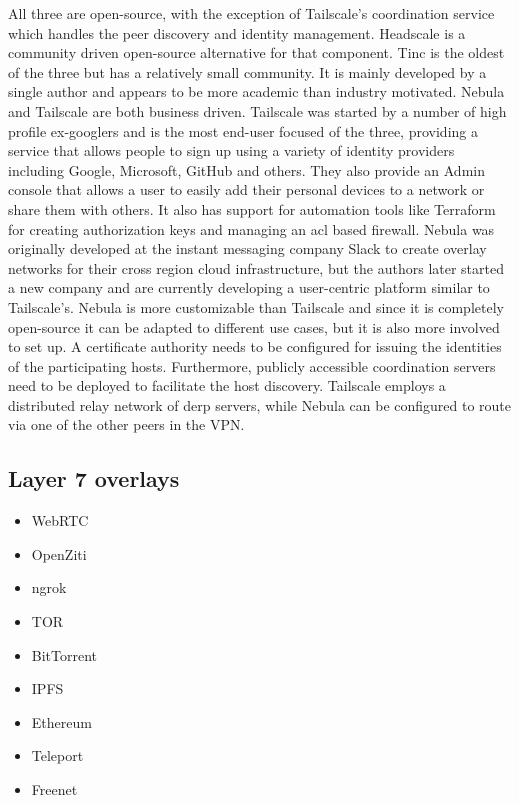 All three are open-source, with the exception of Tailscale's
coordination service which handles the peer discovery and identity
management. Headscale \autocite{fontJuanfontHeadscale2022} is a
community driven open-source alternative for that component. Tinc is the
oldest of the three but has a relatively small community. It is mainly
developed by a single author and appears to be more academic than
industry motivated. Nebula and Tailscale are both business driven.
Tailscale was started by a number of high profile ex-googlers and is the
most end-user focused of the three, providing a service that allows
people to sign up using a variety of identity providers including
Google, Microsoft, GitHub and others. They also provide an Admin console
that allows a user to easily add their personal devices to a network or
share them with others. It also has support for automation tools like
Terraform for creating authorization keys and managing an \gls{acl}
based firewall. Nebula was originally developed at the instant messaging
company Slack to create overlay networks for their cross region cloud
infrastructure, but the authors later started a new company and are
currently developing a user-centric platform similar to Tailscale's.
Nebula is more customizable than Tailscale and since it is completely
open-source it can be adapted to different use cases, but it is also
more involved to set up. A certificate authority needs to be configured
for issuing the identities of the participating hosts. Furthermore,
publicly accessible coordination servers need to be deployed to
facilitate the host discovery. Tailscale employs a distributed relay
network of \gls{derp} servers, while Nebula can be configured to route
via one of the other peers in the VPN.

\hypertarget{layer-7-overlays}{%
\subsection{Layer 7 overlays}\label{layer-7-overlays}}

\begin{itemize}
\tightlist
\item
  WebRTC
\item
  OpenZiti
\item
  ngrok
\item
  TOR
\item
  BitTorrent
\item
  IPFS
\item
  Ethereum
\item
  Teleport
\item
  Freenet
\end{itemize}

